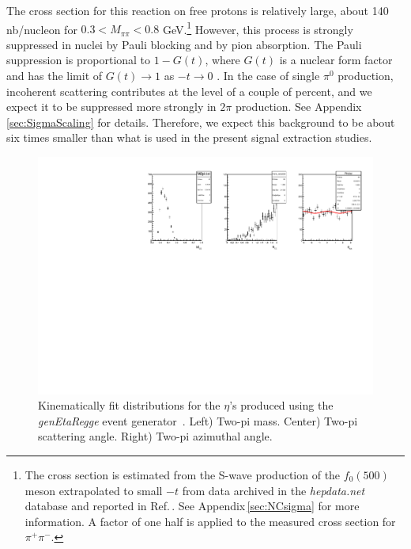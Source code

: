 The cross section for this reaction on free protons is relatively large, about 140 nb/nucleon  for $0.3 < M_{\pi\pi} < 0.8$ GeV.\footnote{The cross section is estimated from the S-wave production of the $f_0(500)$ meson extrapolated to small $-t$ from data archived in the {\em hepdata.net} database and reported in Ref.\,\cite{Battaglieri:2009aa}. See Appendix\,\ref{sec:NCsigma} for more information. A factor of one half is applied to the measured cross section for $\pi^+\pi^-$.} However, this process is strongly suppressed in nuclei by Pauli blocking and by pion absorption. The Pauli suppression is proportional to $1-G(t)$, where $G(t)$ is a nuclear form factor and has the limit of $G(t)\to1$ as $-t\to0$ \cite{Gevorkyan:2009ge,primex_inc}. In the case of single $\pi^0$ production, incoherent scattering contributes at the level of a couple of percent, and we expect it to be suppressed more strongly in $2\pi$ production. See Appendix\,\ref{sec:SigmaScaling} for details. Therefore, we expect this background to be about six times smaller than what is used in the present signal extraction studies.

\begin{figure}[tbp]
\begin{center}
\includegraphics[width=16cm,clip=true]{figures/twopi_primakoff_DSelect_test_File_20000_eta.pdf}
\caption{Kinematically fit distributions for the $\eta$'s produced using the {\em genEtaRegge} event generator~\cite{hdnote2437}.
Left) Two-pi mass. Center) Two-pi scattering angle. Right) Two-pi azimuthal angle.
\label{fig:eta}}
\end{center} 
\end{figure}




